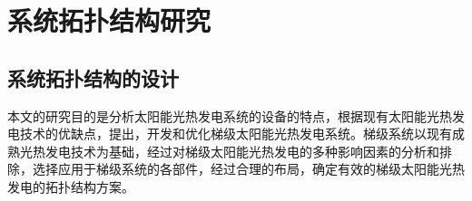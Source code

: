 \chapter{系统拓扑结构研究}
\label{cha:SystemTopology}
\section{系统拓扑结构的设计}
\label{sec:std}

本文的研究目的是分析太阳能光热发电系统的设备的特点，根据现有太阳能光热发电技术的优缺点，提出，开发和优化梯级太阳能光热发电系统。梯级系统以现有成熟光热发电技术为基础，经过对梯级太阳能光热发电的多种影响因素的分析和排除，选择应用于梯级系统的各部件，经过合理的布局，确定有效的梯级太阳能光热发电的拓扑结构方案。

